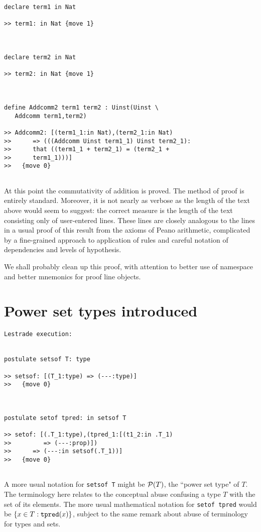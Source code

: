 \documentclass[12pt]{article}
\begin{document}
\begin{verbatim}
declare term1 in Nat

>> term1: in Nat {move 1}



declare term2 in Nat

>> term2: in Nat {move 1}



define Addcomm2 term1 term2 : Uinst(Uinst \
   Addcomm term1,term2)

>> Addcomm2: [(term1_1:in Nat),(term2_1:in Nat)
>>      => (((Addcomm Uinst term1_1) Uinst term2_1):
>>      that ((term1_1 + term2_1) = (term2_1 +
>>      term1_1)))]
>>   {move 0}


\end{verbatim}

At this point the commutativity of addition is proved.  The method of proof is entirely standard.  Moreover, it is not nearly as verbose as the length of the text above would seem to suggest:  the correct measure is the length of the text consisting only of user-entered lines.  These lines are closely analogous to the lines in a usual proof of this result from the axioms of Peano arithmetic, complicated by a fine-grained approach to application of rules and careful notation of dependencies and levels of hypothesis.

We shall probably clean up this proof, with attention to better use of namespace and better mnemonics for proof line objects.

\section{Power set types introduced}

\begin{verbatim}Lestrade execution:


postulate setsof T: type

>> setsof: [(T_1:type) => (---:type)]
>>   {move 0}



postulate setof tpred: in setsof T

>> setof: [(.T_1:type),(tpred_1:[(t1_2:in .T_1)
>>         => (---:prop)])
>>      => (---:in setsof(.T_1))]
>>   {move 0}


\end{verbatim}

A more usual notation for {\tt setsof T} might be ${\cal P}(T)$, the ``power set type" of $T$.  The terminology here relates to the conceptual abuse confusing a type $T$ with the set of its elements.  The more usual mathematical notation for {\tt setof tpred} would be $\{x \in T:{\tt tpred}(x)\}$, subject to the same remark about abuse of terminology for types and sets.
\end{document}
